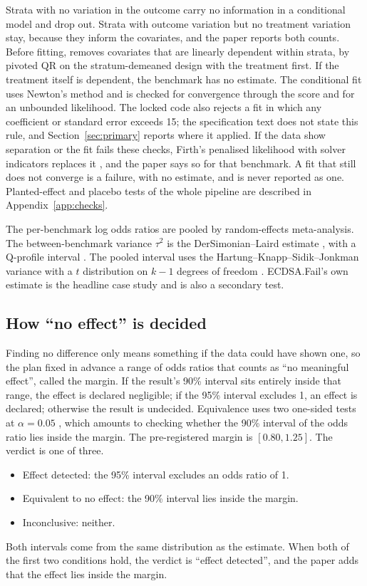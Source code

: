 Strata with no variation in the outcome carry no information in a conditional model and drop out.
Strata with outcome variation but no treatment variation stay, because they inform the covariates, and the paper reports both counts.
Before fitting,  removes covariates that are linearly dependent within strata, by pivoted QR on the stratum-demeaned design with the treatment first.
If the treatment itself is dependent, the benchmark has no estimate.
The conditional fit uses Newton's method and is checked for convergence through the score and for an unbounded likelihood.
The locked code also rejects a fit in which any coefficient or standard error exceeds 15; the specification text does not state this rule, and Section~\ref{sec:primary} reports where it applied.
If the data show separation or the fit fails these checks, Firth's penalised likelihood with solver indicators replaces it \citep{firth1993}, and the paper says so for that benchmark.
A fit that still does not converge is a failure, with no estimate, and is never reported as one.
Planted-effect and placebo tests of the whole pipeline are described in Appendix~\ref{app:checks}.

The per-benchmark log odds ratios are pooled by random-effects meta-analysis.
The between-benchmark variance $\tau^2$ is the DerSimonian--Laird estimate \citep{dersimonian1986}, with a Q-profile interval \citep{viechtbauer2007}.
The pooled interval uses the Hartung--Knapp--Sidik--Jonkman variance with a $t$ distribution on $k-1$ degrees of freedom \citep{hartung2001,sidik2002}.
ECDSA.Fail's own estimate is the headline case study and is also a secondary test.

\subsection{How ``no effect'' is decided}
\label{sec:equivalence}

Finding no difference only means something if the data could have shown one, so the plan fixed in advance a range of odds ratios that counts as ``no meaningful effect'', called the margin.
If the result's 90\% interval sits entirely inside that range, the effect is declared negligible; if the 95\% interval excludes 1, an effect is declared; otherwise the result is undecided.
Equivalence uses two one-sided tests at $\alpha = 0.05$ \citep{schuirmann1987}, which amounts to checking whether the 90\% interval of the odds ratio lies inside the margin.
The pre-registered margin is $[0.80, 1.25]$.
The verdict is one of three.
\begin{itemize}
  \item Effect detected: the 95\% interval excludes an odds ratio of 1.
  \item Equivalent to no effect: the 90\% interval lies inside the margin.
  \item Inconclusive: neither.
\end{itemize}
Both intervals come from the same distribution as the estimate.
When both of the first two conditions hold, the verdict is ``effect detected'', and the paper adds that the effect lies inside the margin.


